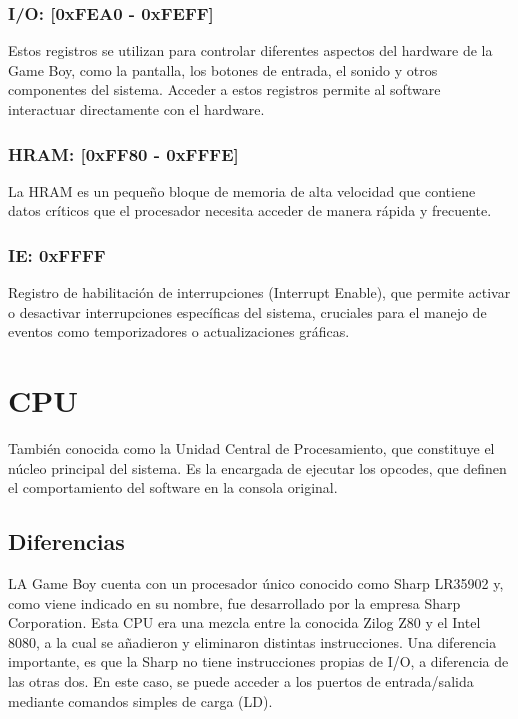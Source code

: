 \subsubsection{I/O: [0xFEA0 - 0xFEFF]}
Estos registros se utilizan para controlar diferentes aspectos del hardware de la Game Boy, como la pantalla, los botones de entrada, el sonido y otros componentes del sistema. Acceder a estos registros permite al software interactuar directamente con el hardware.

\subsubsection{HRAM: [0xFF80 - 0xFFFE]}
La HRAM es un pequeño bloque de memoria de alta velocidad que contiene datos críticos que el procesador necesita acceder de manera rápida y frecuente.

\subsubsection{IE: 0xFFFF}
Registro de habilitación de interrupciones (Interrupt Enable), que permite activar o desactivar interrupciones específicas del sistema, cruciales para el manejo de eventos como temporizadores o actualizaciones gráficas.

\section{CPU}

También conocida como la Unidad Central de Procesamiento, que constituye el núcleo principal del sistema. Es la encargada de ejecutar los opcodes, que definen el comportamiento del software en la consola original.

\subsection{Diferencias}

LA Game Boy cuenta con un procesador único conocido como Sharp LR35902 y, como viene indicado en su nombre, fue desarrollado por la empresa Sharp Corporation. Esta CPU era una mezcla entre la conocida Zilog Z80 y el Intel 8080, a la cual se añadieron y eliminaron distintas instrucciones. Una diferencia importante, es que la Sharp no tiene instrucciones propias de I/O, a diferencia de las otras dos. En este caso, se puede acceder a los puertos de entrada/salida mediante comandos simples de carga (LD).

